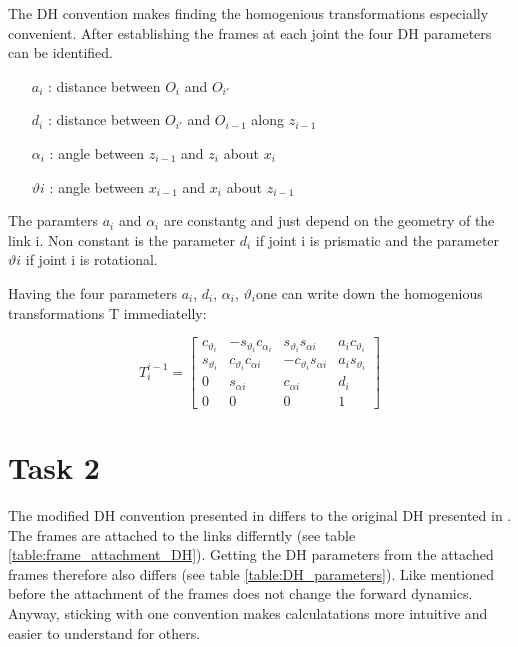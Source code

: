 \documentclass{tpk4170report}
\begin{document}
The DH convention makes finding the homogenious transformations especially convenient. After establishing the frames at each joint the four DH parameters can be identified. 

\begin{itemize}
  \item[\(a_{i}\)]: distance between \(O_{i}\) and \(O_{i'}\) 
  \item[\(d_{i}\)]: distance between \(O_{i'}\) and \(O_{i-1}\) along \(z_{i-1}\)
  \item[\(\alpha_{i}\)]: angle between \(z_{i-1}\) and \(z_{i}\) about \(x_{i}\)
  \item[\(\vartheta{i}\)]:  angle between \(x_{i-1}\) and \(x_{i}\) about \(z_{i-1}\)
\end{itemize}

The paramters \(a_{i}\) and \(\alpha_{i}\) are constantg and just depend on the geometry of the link i. Non constant is the parameter \(d_{i}\) if joint i is prismatic and the parameter \(\vartheta{i}\) if joint i is rotational.

Having the four parameters \(a_{i}\), \(d_{i}\), \(\alpha_{i}\), \(\vartheta_{i}\)one can write down the homogenious transformations T immediatelly: 

\begin{equation}
  T_{i}^{i-1}= 
  \begin{bmatrix}
    c_{\vartheta_{i}} & -s_{\vartheta_{i}}c_{\alpha_{i}} &  s_{\vartheta_{i}}s_{\alpha{i}} & a_{i}c_{\vartheta_{i}} \\
    s_{\vartheta_{i}} & c_{\vartheta_{i}}c_{\alpha{i}} & -c_{\vartheta_{i}}s_{\alpha{i}} & a_{i}s_{\vartheta_{i}} \\
    0 & s_{\alpha{i}} & c_{\alpha{i}} & d_{i} \\
    0 & 0 & 0 & 1
  \end{bmatrix}
  \label{eqn:Transformation_Denavit_Hartenberg}
\end{equation}
\cite{Siciliano2009}

\section{Task 2}
The modified DH convention presented in \cite{Lynch2017} differs to the original DH presented in \cite{Siciliano2009}. The frames are attached to the links differntly (see table \ref{table:frame_attachment_DH}). Getting the DH parameters from the attached frames therefore also differs (see table \ref{table:DH_parameters}). Like mentioned before the attachment of the frames does not change the forward dynamics. Anyway, sticking with one convention makes calculatations more intuitive and easier to understand for others.
\end{document}
